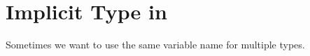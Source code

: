 \documentclass[../main.tex]{subfiles}
\begin{document}
    \section{Implicit Type in \csharp}
    Sometimes we want to use the same variable name for multiple types.
\end{document}
